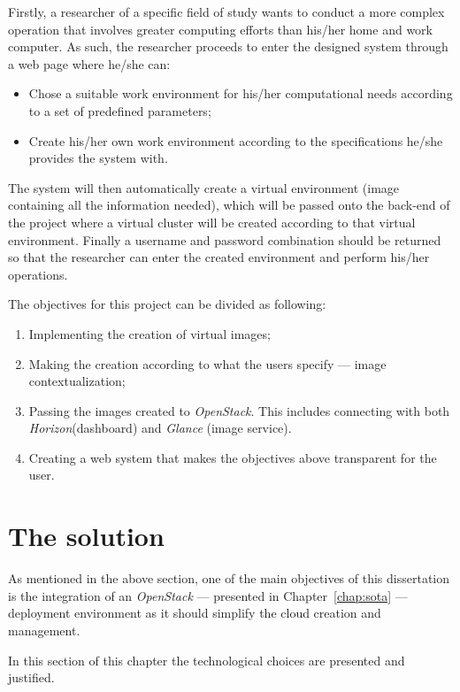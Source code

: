 Firstly, a researcher of a specific field of study wants to conduct a more complex operation that involves greater computing efforts than his/her home and work computer. As such, the researcher proceeds to enter the designed system through a web page where he/she can:

\begin{itemize}
	\item Chose a suitable work environment for his/her computational needs according to a set of predefined parameters;
	\item Create his/her own work environment according to the specifications he/she provides the system with.
\end{itemize}

The system will then automatically create a virtual environment (image containing all the information needed), which will be passed onto the back-end of the project where a virtual cluster will be created according to that virtual environment.
Finally a username and password combination should be returned so that the researcher can enter the created environment and perform his/her operations. 

The objectives for this project can be divided as following:

\begin{enumerate}
\item Implementing the creation of virtual images;
\item Making the creation according to what the users specify --- image contextualization;
\item Passing the images created to \textit{OpenStack}. This includes connecting with both \textit{Horizon}(dashboard) and \textit{Glance} (image service).
\item Creating a web system that makes the objectives above transparent for the user.
\end{enumerate}


\section{The solution}\label{sec:solution}

As mentioned in the above section, one of the main objectives of this dissertation is the integration of an \textit{OpenStack} --- presented in Chapter~\ref{chap:sota} --- deployment environment as it should simplify the cloud creation and management. 

In this section of this chapter the technological choices are presented and justified.

